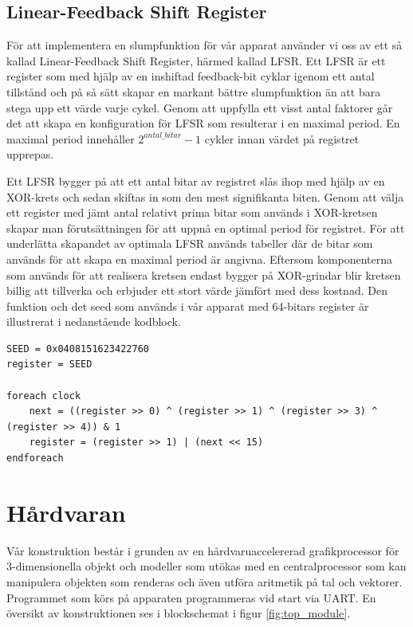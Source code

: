 \documentclass[a4paper]{article}
\begin{document}
    \subsection{Linear-Feedback Shift Register}
    För att implementera en slumpfunktion för vår apparat använder vi oss av ett så kallad 
    Linear-Feedback Shift Register, härmed kallad LFSR. Ett LFSR är ett register som med hjälp av 
    en inshiftad feedback-bit cyklar igenom ett antal tillstånd och på så sätt skapar en markant
    bättre slumpfunktion än att bara stega upp ett värde varje cykel. Genom att uppfylla ett visst
    antal faktorer går det att skapa en konfiguration för LFSR som resulterar i en maximal period.
    En maximal period innehåller $2^{antal\_bitar} - 1$ cykler innan värdet på registret upprepas.

    Ett LFSR bygger på att ett antal bitar av registret slås ihop med hjälp av en XOR-krets och
    sedan skiftas in som den mest signifikanta biten. Genom att välja ett register med jämt antal 
    relativt prima bitar som används i XOR-kretsen skapar man förutsättningen för att uppnå en
    optimal period för registret. För att underlätta skapandet av optimala LFSR används tabeller
    där de bitar som används för att skapa en maximal period är angivna. Eftersom komponenterna som
    används för att realisera kretsen endast bygger på XOR-grindar blir kretsen billig att tillverka
    och erbjuder ett stort värde jämfört med dess kostnad. Den funktion och det seed som används i
    vår apparat med 64-bitars register är illustrerat i nedanstående kodblock.

    \begin{lstlisting}[]
SEED = 0x0408151623422760
register = SEED

foreach clock
    next = ((register >> 0) ^ (register >> 1) ^ (register >> 3) ^ (register >> 4)) & 1
    register = (register >> 1) | (next << 15)
endforeach
    \end{lstlisting}

\section{Hårdvaran}

    Vår konstruktion består i grunden av en hårdvaruaccelererad grafikprocessor
    	för 3-dimensionella objekt och modeller som utökas med en centralprocessor
    som kan manipulera objekten som renderas och även utföra aritmetik på tal
    och vektorer. Programmet som körs på apparaten programmeras vid start via
    UART. En översikt av konstruktionen ses i blockschemat i figur
    \ref{fig:top_module}. 
\end{document}
